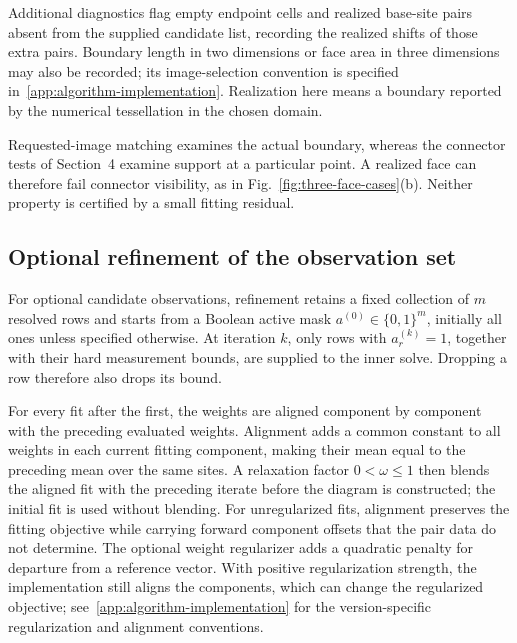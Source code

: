 Additional diagnostics flag empty endpoint cells and realized base-site pairs absent from the supplied candidate list, recording the realized shifts of those extra pairs. Boundary length in two dimensions or face area in three dimensions may also be recorded; its image-selection convention is specified in~\ref{app:algorithm-implementation}. Realization here means a boundary reported by the numerical tessellation in the chosen domain.

Requested-image matching examines the actual boundary, whereas the connector tests of Section~4 examine support at a particular point. A realized face can therefore fail connector visibility, as in Fig.~\ref{fig:three-face-cases}(b). Neither property is certified by a small fitting residual.

\subsection{Optional refinement of the observation set}
\label{subsec:workflow-active-mask}

For optional candidate observations, refinement retains a fixed collection of $m$ resolved rows and starts from a Boolean active mask $a^{(0)}\in\{0,1\}^m$, initially all ones unless specified otherwise. At iteration $k$, only rows with $a_r^{(k)}=1$, together with their hard measurement bounds, are supplied to the inner solve. Dropping a row therefore also drops its bound.

For every fit after the first, the weights are aligned component by component with the preceding evaluated weights. Alignment adds a common constant to all weights in each current fitting component, making their mean equal to the preceding mean over the same sites. A relaxation factor $0<\omega\le1$ then blends the aligned fit with the preceding iterate before the diagram is constructed; the initial fit is used without blending. For unregularized fits, alignment preserves the fitting objective while carrying forward component offsets that the pair data do not determine. The optional weight regularizer adds a quadratic penalty for departure from a reference vector. With positive regularization strength, the implementation still aligns the components, which can change the regularized objective; see~\ref{app:algorithm-implementation} for the version-specific regularization and alignment conventions.


